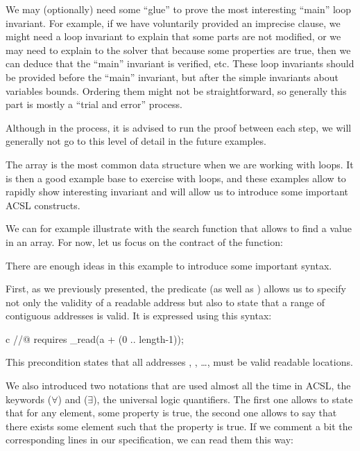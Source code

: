 We may (optionally) need some ``glue'' to prove the most interesting ``main''
loop invariant. For example, if we have voluntarily provided an imprecise
 clause, we might need a loop invariant to explain that
some parts are not modified, or we may need to explain to the solver that
because some properties are true, then we can deduce that the ``main'' invariant
is verified, etc. These loop invariants should be provided before the ``main''
invariant, but after the simple invariants about variables bounds. Ordering them
might not be straightforward, so generally this part is mostly a
``trial and error'' process.


Although in the process, it is advised to run the proof between each step, we
will generally not go to this level of detail in the future examples.


\label{l3:statements-loops-examples-ro}


The array is the most common data structure when we are working with loops.
It is then a good example base to exercise with loops, and these
examples allow to rapidly show interesting invariant and will allow us
to introduce some important ACSL constructs.


We can for example illustrate with the search function that allows to find a
value in an array. For now, let us focus on the contract of the function:




There are enough ideas in this example to introduce some important syntax.


First, as we previously presented, the
 predicate (as well as
) allows us to specify not only the
validity of a readable address but also to state that a range of
contiguous addresses is valid. It is expressed using this syntax:


\begin{CodeBlock}{c}
//@ requires \valid_read(a + (0 .. length-1));
\end{CodeBlock}


This precondition states that all addresses ,
, \ldots{},  must be valid readable
locations.


We also introduced two notations that are used almost all the time in
ACSL, the keywords  ($\forall$) and
 ($\exists$), the universal logic
quantifiers. The first one allows to state that for any element, some
property is true, the second one allows to say that there exists some
element such that the property is true. If we comment a bit the
corresponding lines in our specification, we can read them this way:


